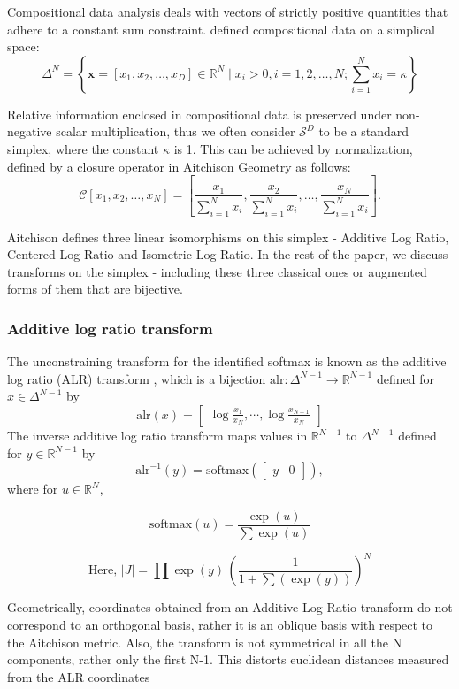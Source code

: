 \documentclass[11pt]{article}
\newcommand{\abs}[1]{\left| #1 \right|}
\begin{document}
Compositional data analysis deals with vectors of strictly positive quantities that adhere to a constant sum constraint. \cite{aitchison1982statistical} defined compositional data on a simplical space:
$$
\Delta^N=\left\{\mathbf{x}=\left[x_1, x_2, \ldots, x_D\right] \in \mathbb{R}^N \mid x_i>0, i=1,2, \ldots, N ; \sum_{i=1}^N x_i=\kappa\right\}
$$

Relative information enclosed in compositional data is preserved under non-negative scalar multiplication, thus we often consider $\mathcal{S}^D$ to be a standard simplex, where the constant $\kappa$ is 1. This can be achieved by normalization, defined by a closure operator in Aitchison Geometry as follows:
$$
\mathcal{C}\left[x_1, x_2, \ldots, x_N\right]=\left[\frac{x_1}{\sum_{i=1}^N x_i}, \frac{x_2}{\sum_{i=1}^N x_i}, \ldots, \frac{x_N}{\sum_{i=1}^N x_i}\right].
$$

Aitchison defines three linear isomorphisms on this simplex - Additive Log Ratio, Centered Log Ratio and Isometric Log Ratio. In the rest of the paper, we discuss transforms on the simplex - including these three classical ones or augmented forms of them that are bijective.


\subsubsection{Additive log ratio transform}
The unconstraining transform for the identified softmax is known as
the additive log ratio (ALR) transform
\cite{aitchison1982statistical}, which is a bijection
$\textrm{alr}:\Delta^{N-1} \rightarrow \mathbb{R}^{N-1}$ defined for
$x \in \Delta^{N-1}$ by
\[
  \textrm{alr}(x)
  = \begin{bmatrix}\displaystyle
    \log \frac{x_1}{x_N}, \cdots , \log \frac{x_{N-1}}{x_N}
  \end{bmatrix}
\]
The inverse additive log ratio transform maps values in
$\mathbb{R}^{N-1}$ to $\Delta^{N-1}$ defined for $y \in
\mathbb{R}^{N-1}$ by
\[
  \textrm{alr}^{-1}(y)
  = \textrm{softmax}(\begin{bmatrix} y &  0 \end{bmatrix}),
\]
where for $u \in \mathbb{R}^N$,

\[
  \textrm{softmax}(u) = \frac{\exp(u)}{\sum \exp(u)}
\]

\[
\textrm{Here, } \abs{J} = \prod \exp(y)
  \, \left( \frac{1}{1 + \sum(\exp(y))} \right)^N
\]

Geometrically, coordinates obtained from an Additive Log Ratio transform do not correspond to an orthogonal basis, rather it is an oblique basis with respect to the Aitchison metric. Also, the transform is not symmetrical in all the N components, rather only the first N-1. This distorts euclidean distances measured from the ALR coordinates
\end{document}
